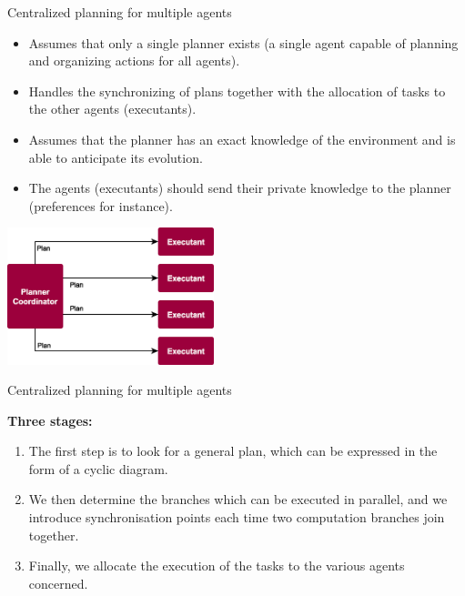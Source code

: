 \documentclass[9pt]{beamer}
\begin{document}
\begin{frame}{Centralized planning for multiple agents}
\begin{small}
\begin{itemize}
\item Assumes that only \textcolor{CS-1light}{a single planner} exists (a single agent capable of planning and organizing actions for all agents).
\item Handles the synchronizing of plans together with the allocation of tasks to the other agents (executants).
\item Assumes that the planner has an \textcolor{CS-1light}{exact knowledge of the environment} and is able  to anticipate its evolution.
\item The agents (executants) should send their \textcolor{CS-1light}{private} knowledge to the planner (preferences for instance).
\end{itemize}

\begin{center}
\includegraphics[keepaspectratio, width=0.45\textwidth]{images/mas_planning_centralized.eps}
\end{center}
\end{small}
\end{frame}


\begin{frame}{Centralized planning for multiple agents}
\begin{small}
\textbf{Three stages:}
\begin{enumerate}
\item The first step is to look for a general plan, which can be expressed in the form of a cyclic diagram.
\item We then determine the branches which can be executed in parallel, and we introduce synchronisation points each time two computation branches join together.
\item Finally, we allocate the execution of the tasks to the various agents concerned.
\end{enumerate}
\end{small}
\end{frame}
\end{document}
